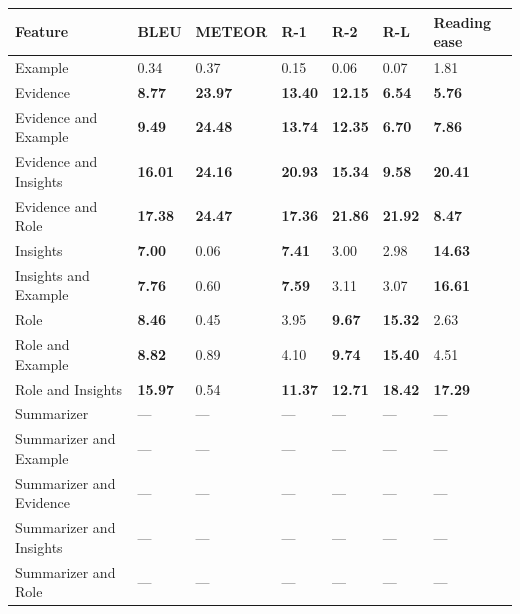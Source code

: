 \begin{tabular}{|l|l|l|l|l|l|l|}
\hline
\textbf{Feature} & BLEU & METEOR & R-1 & R-2 & R-L & Reading ease \\
 \hline
 Example & 0.34 & 0.37 & 0.15 & 0.06 & 0.07 & 1.81 \\
 \hline
 Evidence & \textbf{8.77} & \textbf{23.97} & \textbf{13.40} & \textbf{12.15} & \textbf{6.54} & \textbf{5.76} \\
 \hline
 Evidence and Example & \textbf{9.49} & \textbf{24.48} & \textbf{13.74} & \textbf{12.35} & \textbf{6.70} & \textbf{7.86} \\
 \hline
 Evidence and Insights & \textbf{16.01} & \textbf{24.16} & \textbf{20.93} & \textbf{15.34} & \textbf{9.58} & \textbf{20.41} \\
 \hline
 Evidence and Role & \textbf{17.38} & \textbf{24.47} & \textbf{17.36} & \textbf{21.86} & \textbf{21.92} & \textbf{8.47} \\
 \hline
 Insights & \textbf{7.00} & 0.06 & \textbf{7.41} & 3.00 & 2.98 & \textbf{14.63} \\
 \hline
 Insights and Example & \textbf{7.76} & 0.60 & \textbf{7.59} & 3.11 & 3.07 & \textbf{16.61} \\
 \hline
 Role & \textbf{8.46} & 0.45 & 3.95 & \textbf{9.67} & \textbf{15.32} & 2.63 \\
 \hline
 Role and Example & \textbf{8.82} & 0.89 & 4.10 & \textbf{9.74} & \textbf{15.40} & 4.51 \\
 \hline
 Role and Insights & \textbf{15.97} & 0.54 & \textbf{11.37} & \textbf{12.71} & \textbf{18.42} & \textbf{17.29} \\
 \hline
 Summarizer & — & — & — & — & — & — \\
 \hline
 Summarizer and Example & — & — & — & — & — & — \\
 \hline
 Summarizer and Evidence & — & — & — & — & — & — \\
 \hline
 Summarizer and Insights & — & — & — & — & — & — \\
 \hline
 Summarizer and Role & — & — & — & — & — & — \\
\hline
\end{tabular}
